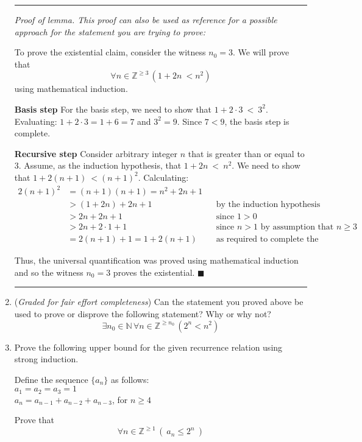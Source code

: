 \documentclass[12pt, oneside]{article}
\begin{document}
\begin{enumerate}
\newpage
\rule{0.5\textwidth}{.4pt}

{\it Proof of lemma. This proof can also be used as reference for a possible approach for the statement you are trying to prove:} 

To prove the existential claim, consider the witness $n_0 = 3$. We will prove that
$$ \forall n \in \mathbb{Z}^{\geq 3} \, (1+2n~ < n^2)$$
using mathematical induction.

{\bf Basis step} For the basis step, we need to show that $1+2 \cdot 3 ~<~3^2$. Evaluating: $1+2 \cdot 3 = 1 + 6 =7$
and $3^2 = 9$. Since $7< 9$, the basis step is complete.

{\bf Recursive step} Consider arbitrary integer $n$ that is greater than or equal to $3$. Assume, as the induction hypothesis, 
that $1 + 2n ~<~ n^2$. We need to show that $1+2(n+1)~ < (n+1)^2$. Calculating: 
\begin{alignat*}{2}
(n+1)^2 &= (n+1) (n+1) = n^2 + 2n + 1 && \\
&> (1 + 2n) + 2n +1 &&\text{by the induction hypothesis} \\
&> 2n + 2n + 1 && \text{since $1 > 0$} \\
&> 2n + 2 \cdot 1 + 1 &&\text{since $n > 1$ by assumption that $n \geq 3$}\\
&= 2(n+1) +1 = 1 + 2(n+1) &&\text{as required to complete the recursive step.}
\end{alignat*}

Thus, the universal quantification was proved using mathematical induction and so the witness $n_0 = 3$
proves the existential. \hfill{$\blacksquare$}

\rule{0.5\textwidth}{.4pt}

\item ({\it Graded for fair effort completeness}) 
Can the statement you proved above be used to prove or disprove the following statement? Why or why not?
$$\exists n_0 \in \mathbb{N} \, \forall n \in \mathbb{Z}^{\geq n_0} \, (2^n < n^2)$$

\item Prove the following upper bound for the given recurrence relation using strong induction.

Define the sequence $\{a_n\}$ as follows:\\

    $a_1 = a_2 = a_3 = 1$\\
    $a_n = a_{n-1} + a_{n-2} + a_{n-3}$, for $n \geq 4$

Prove that $$\forall n \in \mathbb{Z}^{\geq 1} \, (~a_n \leq 2^n~)$$


\end{enumerate}
\end{document}
